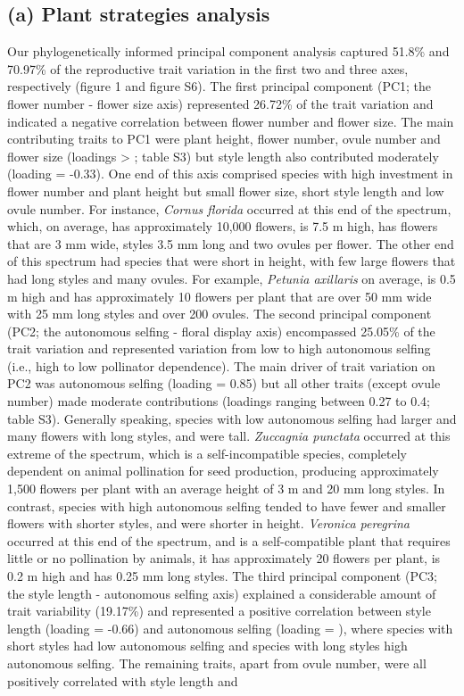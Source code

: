 \documentclass[
  12pt,
  a4paper,
]{article}
\begin{document}
\hypertarget{a-plant-strategies-analysis}{%
\subsection{(a) Plant strategies analysis}\label{a-plant-strategies-analysis}}

Our phylogenetically informed principal component analysis captured 51.8\% and 70.97\% of the reproductive trait variation in the first two and three axes, respectively (figure 1 and figure S6). The first principal component (PC1; the flower number - flower size axis) represented 26.72\% of the trait variation and indicated a negative correlation between flower number and flower size. The main contributing traits to PC1 were plant height, flower number, ovule number and flower size (loadings \textgreater{} \textbar; table S3) but style length also contributed moderately (loading = -0.33). One end of this axis comprised species with high investment in flower number and plant height but small flower size, short style length and low ovule number. For instance, \emph{Cornus florida} occurred at this end of the spectrum, which, on average, has approximately 10,000 flowers, is 7.5 m high, has flowers that are 3 mm wide, styles 3.5 mm long and two ovules per flower. The other end of this spectrum had species that were short in height, with few large flowers that had long styles and many ovules. For example, \emph{Petunia axillaris} on average, is 0.5 m high and has approximately 10 flowers per plant that are over 50 mm wide with 25 mm long styles and over 200 ovules. The second principal component (PC2; the autonomous selfing - floral display axis) encompassed 25.05\% of the trait variation and represented variation from low to high autonomous selfing (i.e., high to low pollinator dependence). The main driver of trait variation on PC2 was autonomous selfing (loading = 0.85) but all other traits (except ovule number) made moderate contributions (loadings ranging between 0.27 to 0.4; table S3). Generally speaking, species with low autonomous selfing had larger and many flowers with long styles, and were tall. \emph{Zuccagnia punctata} occurred at this extreme of the spectrum, which is a self-incompatible species, completely dependent on animal pollination for seed production, producing approximately 1,500 flowers per plant with an average height of 3 m and 20 mm long styles. In contrast, species with high autonomous selfing tended to have fewer and smaller flowers with shorter styles, and were shorter in height. \emph{Veronica peregrina} occurred at this end of the spectrum, and is a self-compatible plant that requires little or no pollination by animals, it has approximately 20 flowers per plant, is 0.2 m high and has 0.25 mm long styles. The third principal component (PC3; the style length - autonomous selfing axis) explained a considerable amount of trait variability (19.17\%) and represented a positive correlation between style length (loading = -0.66) and autonomous selfing (loading = \textbar), where species with short styles had low autonomous selfing and species with long styles high autonomous selfing. The remaining traits, apart from ovule number, were all positively correlated with style length and 
\end{document}

